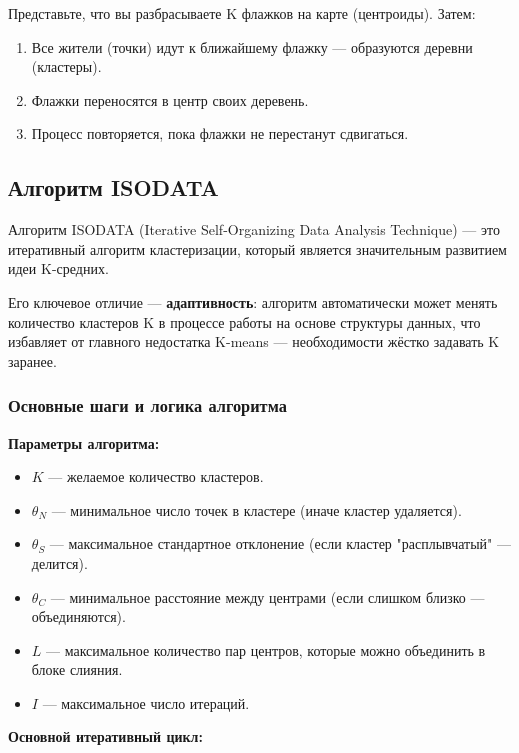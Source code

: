 \documentclass[11pt]{article}
\begin{document}
Представьте, что вы разбрасываете K флажков на карте (центроиды). Затем:

\begin{enumerate}
    \item Все жители (точки) идут к ближайшему флажку — образуются деревни (кластеры).
    \item Флажки переносятся в центр своих деревень.
    \item Процесс повторяется, пока флажки не перестанут сдвигаться.
\end{enumerate}

\subsection{Алгоритм ISODATA}

Алгоритм ISODATA (Iterative Self-Organizing Data Analysis Technique) — это итеративный алгоритм кластеризации, который является значительным развитием идеи K-средних.

Его ключевое отличие — \textbf{адаптивность}: алгоритм автоматически может менять количество кластеров K в процессе работы на основе структуры данных, что избавляет от главного недостатка K-means — необходимости жёстко задавать K заранее.

\subsubsection{Основные шаги и логика алгоритма}

\textbf{Параметры алгоритма:}
\begin{itemize}
    \item $K$ — желаемое количество кластеров.
    \item $\theta_N$ — минимальное число точек в кластере (иначе кластер удаляется).
    \item $\theta_S$ — максимальное стандартное отклонение (если кластер "расплывчатый" — делится).
    \item $\theta_C$ — минимальное расстояние между центрами (если слишком близко — объединяются).
    \item $L$ — максимальное количество пар центров, которые можно объединить в блоке слияния.
    \item $I$ — максимальное число итераций.
\end{itemize}

\textbf{Основной итеративный цикл:}
\end{document}
